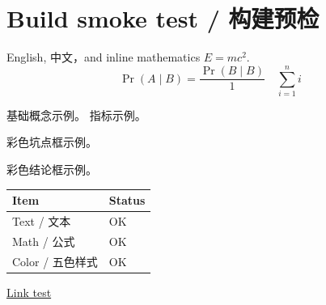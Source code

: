 \documentclass[11pt,a4paper]{article}
\begin{document}
\section*{Build smoke test / 构建预检}
English, 中文，and inline mathematics $E=mc^2$.
\[
  \Pr(A\mid B)=\frac{\Pr(B\mid B)}{1}\quad \sum_{i=1}^{n} i
\]


基础概念示例。 指标示例。

\begin{trapbox}
  彩色坑点框示例。
\end{trapbox}
\begin{conclbox}
  彩色结论框示例。
\end{conclbox}

\begin{tabular}{ll}
  \toprule
  Item & Status \\
  \midrule
  Text / 文本 & OK \\
  Math / 公式 & OK \\
  Color / 五色样式 & OK \\
  \bottomrule
\end{tabular}

\href{https://example.com}{Link test}
\end{document}
